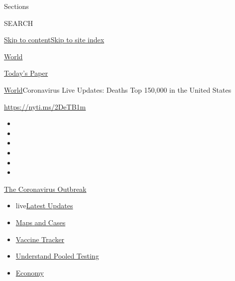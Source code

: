Sections

SEARCH

\protect\hyperlink{site-content}{Skip to
content}\protect\hyperlink{site-index}{Skip to site index}

\href{https://www.nytimes3xbfgragh.onion/section/world}{World}

\href{https://myaccount.nytimes3xbfgragh.onion/auth/login?response_type=cookie\&client_id=vi}{}

\href{https://www.nytimes3xbfgragh.onion/section/todayspaper}{Today's
Paper}

\href{/section/world}{World}\textbar{}Coronavirus Live Updates: Deaths
Top 150,000 in the United States

\url{https://nyti.ms/2DeTB1m}

\begin{itemize}
\item
\item
\item
\item
\item
\item
\end{itemize}

\href{https://www.nytimes3xbfgragh.onion/news-event/coronavirus?action=click\&pgtype=Article\&state=default\&region=TOP_BANNER\&context=storylines_menu}{The
Coronavirus Outbreak}

\begin{itemize}
\tightlist
\item
  live\href{https://www.nytimes3xbfgragh.onion/2020/07/29/world/coronavirus-covid-19.html?action=click\&pgtype=Article\&state=default\&region=TOP_BANNER\&context=storylines_menu}{Latest
  Updates}
\item
  \href{https://www.nytimes3xbfgragh.onion/interactive/2020/us/coronavirus-us-cases.html?action=click\&pgtype=Article\&state=default\&region=TOP_BANNER\&context=storylines_menu}{Maps
  and Cases}
\item
  \href{https://www.nytimes3xbfgragh.onion/interactive/2020/science/coronavirus-vaccine-tracker.html?action=click\&pgtype=Article\&state=default\&region=TOP_BANNER\&context=storylines_menu}{Vaccine
  Tracker}
\item
  \href{https://www.nytimes3xbfgragh.onion/interactive/2020/07/27/upshot/coronavirus-pooled-testing.html?action=click\&pgtype=Article\&state=default\&region=TOP_BANNER\&context=storylines_menu}{Understand
  Pooled Testing}
\item
  \href{https://www.nytimes3xbfgragh.onion/live/2020/07/29/business/stock-market-today-coronavirus?action=click\&pgtype=Article\&state=default\&region=TOP_BANNER\&context=storylines_menu}{Economy}
\end{itemize}

